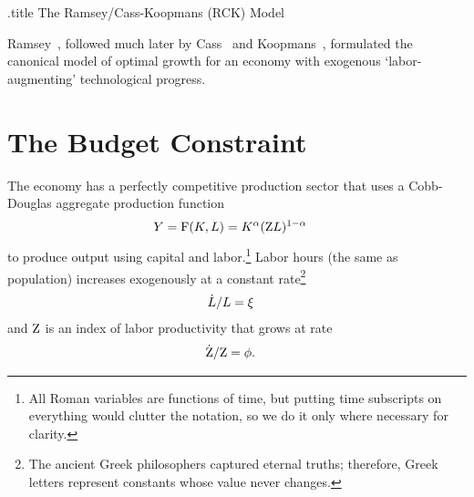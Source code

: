 \documentclass{handout}
\begin{document}
\handoutHeader

\begin{verbatimwrite}{\jobname.title}
  The Ramsey/Cass-Koopmans (RCK) Model
\end{verbatimwrite}

\handoutNameMake



\renewcommand{\cite}{\citeyearpar}

Ramsey~\cite{ramseySave}, followed much later by Cass~\cite{cass:growth} and Koopmans~\cite{koopmans:growth}, formulated the canonical model of optimal growth for an economy with exogenous `labor-augmenting' technological progress.

\section{The Budget Constraint}

The economy has a perfectly competitive production sector that uses a Cobb-Douglas aggregate production function 
\begin{equation}\begin{gathered}\begin{aligned}
                   {Y} & =  \mathrm{F}({K},L) = {K}^{\alpha}(\mathrm{Z} L)^{1-\alpha}
\end{aligned}\end{gathered}\end{equation}
to produce output using capital and labor.\footnote{All Roman variables are functions of time, but putting time subscripts on everything would clutter the notation, so we do it only where necessary for clarity.}  Labor hours (the same as population) increases exogenously at a constant rate\footnote{The ancient Greek philosophers captured eternal truths; therefore, Greek letters represent constants whose value never changes.}
\begin{equation}\begin{gathered}\begin{aligned}
  \dot{L}/L & =  \xi
\end{aligned}\end{gathered}\end{equation}
and $\mathrm{Z} $ is an index of labor productivity that grows at rate 
\begin{equation}\begin{gathered}\begin{aligned}
  \dot{\mathrm{Z} }/\mathrm{Z}  & =  \phi. 
\end{aligned}\end{gathered}\end{equation}
\end{document}
